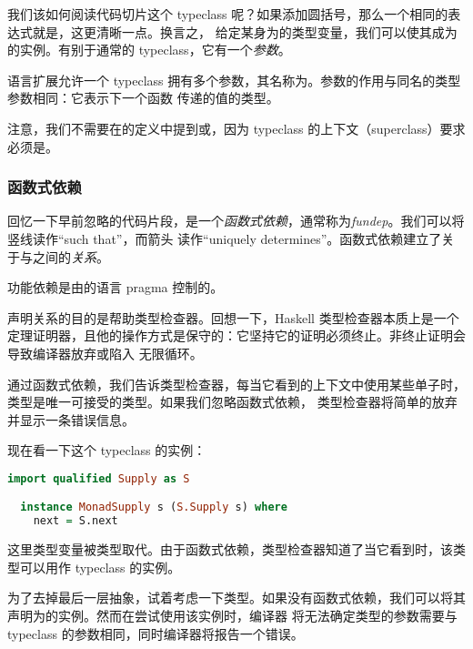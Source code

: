 \documentclass[./main.tex]{subfiles}
\begin{document}
我们该如何阅读代码切片这个 typeclass 呢？如果添加圆括号，那么一个相同的表达式就是，这更清晰一点。换言之，
给定某身为的类型变量，我们可以使其成为的实例。有别于通常的 typeclass，它有一个\textit{参数}。

语言扩展允许一个 typeclass 拥有多个参数，其名称为。参数的作用与同名的类型参数相同：它表示下一个函数
传递的值的类型。

注意，我们不需要在的定义中提到\acode{(>>=)}或，因为 typeclass 的上下文（superclass）要求
必须是。

\subsubsection*{函数式依赖}

回忆一下早前忽略的代码片段，是一个\textit{函数式依赖}，通常称为\textit{fundep}。我们可以将竖线\acode{|}读作“such that”，而箭头\acode{->}
读作“uniquely determines”。函数式依赖建立了关于与之间的\textit{关系}。

功能依赖是由的语言 pragma 控制的。

声明关系的目的是帮助类型检查器。回想一下，Haskell 类型检查器本质上是一个定理证明器，且他的操作方式是保守的：它坚持它的证明必须终止。非终止证明会导致编译器放弃或陷入
无限循环。

通过函数式依赖，我们告诉类型检查器，每当它看到的上下文中使用某些单子时，类型是唯一可接受的类型。如果我们忽略函数式依赖，
类型检查器将简单的放弃并显示一条错误信息。

现在看一下这个 typeclass 的实例：

\begin{lstlisting}[language=Haskell]
  import qualified Supply as S

  instance MonadSupply s (S.Supply s) where
    next = S.next
\end{lstlisting}

这里类型变量被类型取代。由于函数式依赖，类型检查器知道了当它看到时，该类型可以用作 typeclass
的实例。

为了去掉最后一层抽象，试着考虑一下类型。如果没有函数式依赖，我们可以将其声明为的实例。然而在尝试使用该实例时，编译器
将无法确定类型的参数需要与 typeclass 的参数相同，同时编译器将报告一个错误。
\end{document}
